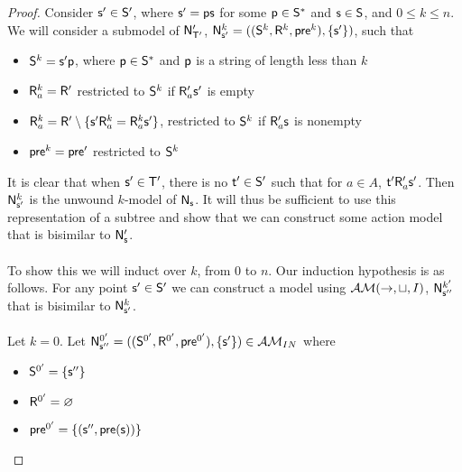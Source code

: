 \begin{proof}
	Consider $\evs' \in \evS'$, where $\evs' = \evp \evs$ for some $\evp \in \evS^\ast$ and $\evs \in
	\evS$, and $0 \leq k \leq n$.
	We will consider a submodel of $\evM'_{\evT'}$, $\evM^k_{\evs'} =
	((\evS^k,\evR^k,\evpr^k),\{\evs'\})$, such that
	\begin{itemize}
		\item $\evS^k = \evs' \evp$, where $\evp \in \evS^\ast$ and $\evp$ is a string of length less
			than $k$
		\item $\evR^k_a = \evR'$ restricted to $\evS^k$ if $\evR'_a \evs'$ is empty
		\item $\evR^k_a = \evR' \setminus \{\evs' \evR^k_a = \evR^k_a \evs'\}$,
    restricted to $\evS^k$ if $\evR'_a \evs$ is nonempty
		\item $\evpr^k = \evpr'$ restricted to $\evS^k$
	\end{itemize}

	It is clear that when $\evs' \in \evT'$, there is no $\evt' \in \evS'$ such
  that for $a \in A$, $\evt' \evR'_a \evs'$.
  Then $\evM^k_{\evs'}$ is the unwound $k$-model of $\evM_\evs$.
	It will thus be sufficient to use this representation of a subtree and show that we can construct
	some action model that is bisimilar to $\evM'_\evs$.\\
	\\
	To show this we will induct over $k$, from 0 to $n$.
	Our induction hypothesis is as follows.
  For any point $\evs' \in \evS'$ we can construct a model using
  $\EM(\to,\sqcup,I)$, $\evM^{k'}_{\evs''}$ that is bisimilar to $\evM^k_{\evs'}$.\\
	\\
	Let $k = 0$.
	Let $\evM^{0'}_{\evs''} = ((\evS^{0'},\evR^{0'},\evpr^{0'}),\{\evs'\}) \in \insaneClass$ where
	\begin{itemize}
		\item $\evS^{0'} = \{\evs''\}$
		\item $\evR^{0'} = \varnothing$
		\item $\evpr^{0'} = \{(\evs'',\evpr(\evs))\}$
	\end{itemize}


\end{proof}
